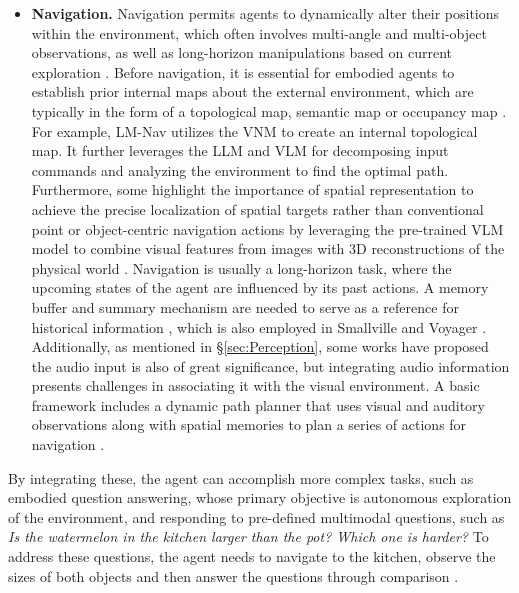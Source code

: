 \begin{itemize}[leftmargin=*]
    \item \textbf{Navigation.} 
    Navigation permits agents to dynamically alter their positions within the environment, which often involves multi-angle and multi-object observations, as well as long-horizon manipulations based on current exploration \cite{DBLP:journals/corr/abs-2305-13246}. Before navigation, it is essential for embodied agents to establish prior internal maps about the external environment, which are typically in the form of a topological map, semantic map or occupancy map \cite{DBLP:journals/tetci/DuanYTZT22}. For example, LM-Nav \cite{DBLP:conf/corl/ShahOIL22} utilizes the VNM \cite{DBLP:conf/icra/ShahEKRL21} to create an internal topological map. It further leverages the LLM and VLM for decomposing input commands and analyzing the environment to find the optimal path. Furthermore, some \cite{DBLP:conf/icra/HuangMZB23, DBLP:conf/cvpr/GeorgakisSWDMRD22} highlight the importance of spatial representation to achieve the precise localization of spatial targets rather than conventional point or object-centric navigation actions by leveraging the pre-trained VLM model to combine visual features from images with 3D reconstructions of the physical world \cite{DBLP:journals/tetci/DuanYTZT22}. Navigation is usually a long-horizon task, where the upcoming states of the agent are influenced by its past actions. A memory buffer and summary mechanism are needed to serve as a reference for historical information \cite{DBLP:journals/corr/abs-2305-16986}, which is also employed in Smallville and Voyager \cite{DBLP:journals/corr/abs-2304-03442, DBLP:journals/corr/abs-2305-16291, DBLP:journals/corr/abs-2303-03480, DBLP:conf/cvpr/LiZZYLZWYZHCG22}.
    Additionally, as mentioned in \S \ref{sec:Perception}, some works have proposed the audio input is also of great significance, but integrating audio information presents challenges in associating it with the visual environment. A basic framework includes a dynamic path planner that uses visual and auditory observations along with spatial memories to plan a series of actions for navigation \cite{DBLP:conf/nips/00070C22, DBLP:conf/icra/GanZ0GT20}. 
    
\end{itemize}

By integrating these, the agent can accomplish more complex tasks, such as embodied question answering, whose primary objective is autonomous exploration of the environment, and responding to pre-defined multimodal questions, such as \textit{Is the watermelon in the kitchen larger than the pot? Which one is harder?} To address these questions, the agent needs to navigate to the kitchen, observe the sizes of both objects and then answer the questions through comparison \cite{DBLP:journals/tetci/DuanYTZT22}. 

